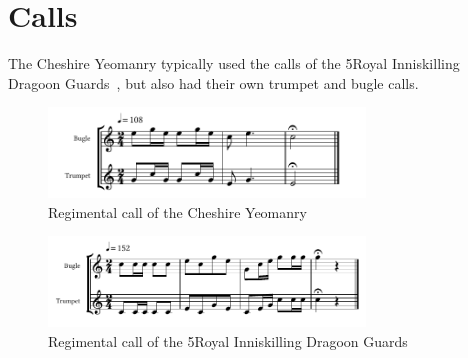 \section*{Calls}

The Cheshire Yeomanry typically used the calls of the 5\nth Royal Inniskilling Dragoon Guards~\cite[p11]{trumpet-and-bugle-calls}, but also had their own trumpet and bugle calls.

\begin{figure}[h]
  \centering
  \includegraphics[width=0.75\textwidth]{gazette/cheshire-yeomanry-call.pdf}
  \caption*{Regimental call of the Cheshire Yeomanry~\cite[p11]{trumpet-and-bugle-calls}}
\end{figure}

\begin{figure}[h]
  \centering
  \includegraphics[width=0.75\textwidth]{gazette/5ridg-call.pdf}
  \caption*{Regimental call of the 5\nth Royal Inniskilling Dragoon Guards~\cite[p3]{trumpet-and-bugle-calls}}
\end{figure}
